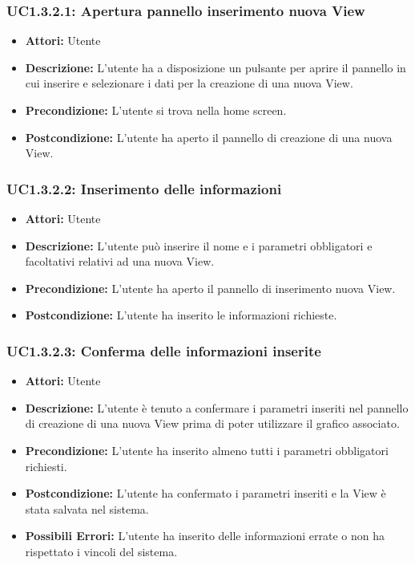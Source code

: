 \subsubsection{UC1.3.2.1: Apertura pannello inserimento nuova View}

\begin{itemize}
    \item \textbf{Attori:} Utente
    \item \textbf{Descrizione:} L'utente ha a disposizione un pulsante per aprire il pannello in cui inserire e selezionare i dati per la creazione di una nuova View.
    \item \textbf{Precondizione:} L'utente si trova nella home screen.
    \item \textbf{Postcondizione:} L'utente ha aperto il pannello di creazione di una nuova View.
\end{itemize}

\subsubsection{UC1.3.2.2: Inserimento delle informazioni}

\begin{itemize}
    \item \textbf{Attori:} Utente
    \item \textbf{Descrizione:} L'utente può inserire il nome e i parametri obbligatori e facoltativi relativi ad una nuova View.
    \item \textbf{Precondizione:} L'utente ha aperto il pannello di inserimento nuova View.
    \item \textbf{Postcondizione:} L'utente ha inserito le informazioni richieste.
\end{itemize}

\subsubsection{UC1.3.2.3: Conferma delle informazioni inserite}

\begin{itemize}
    \item \textbf{Attori:} Utente
    \item \textbf{Descrizione:} L'utente è tenuto a confermare i parametri inseriti nel pannello di creazione di una nuova View prima di poter utilizzare il grafico associato.
    \item \textbf{Precondizione:} L'utente ha inserito almeno tutti i parametri obbligatori richiesti.
    \item \textbf{Postcondizione:} L'utente ha confermato i parametri inseriti e la View è stata salvata nel sistema.
    \item \textbf{Possibili Errori:} L'utente ha inserito delle informazioni errate o non ha rispettato i vincoli del sistema.
\end{itemize}


